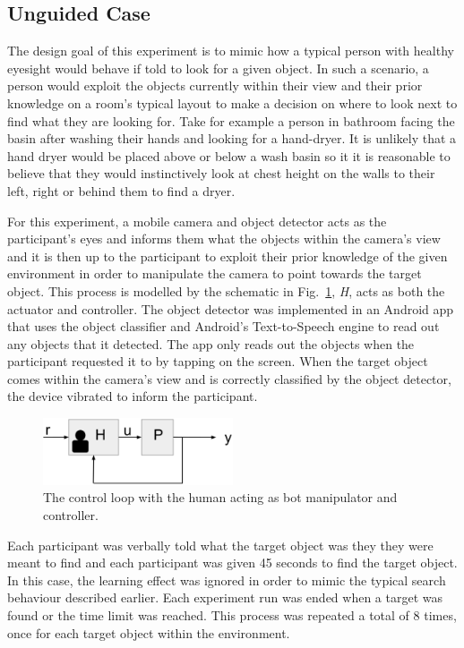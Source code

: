 \documentclass[runningheads]{llncs}
\begin{document}
\subsection{Unguided Case}

The design goal of this experiment is to mimic how a typical person with healthy eyesight would behave if told to look for a given object. 
In such a scenario, a person would exploit the objects currently within their view and their prior knowledge on a room's typical layout to make a decision on where to look next to find what they are looking for. 
Take for example a person in bathroom facing the basin after washing their hands and looking for a hand-dryer. 
It is unlikely that a hand dryer would be placed above or below a wash basin so it it is reasonable to believe that they would instinctively look at chest height on the walls to their left, right or behind them to find a dryer. 

For this experiment, a mobile camera and object detector acts as the participant's eyes and informs them what the objects within the camera's view and it is then up to the participant to exploit their prior knowledge of the given environment in order to manipulate the camera to point towards the target object. 
This process is modelled by the schematic in Fig.~\ref{fig:sys-diagram-no-controller}, \emph{H}, acts as both the actuator and controller.
The object detector was implemented in an Android app that uses the object classifier and Android's Text-to-Speech engine to read out any objects that it detected. 
The app only reads out the objects when the participant requested it to by tapping on the screen. 
When the target object comes within the camera's view and is correctly classified by the object detector, the device vibrated to inform the participant. 

\begin{figure}
  \centering
  \includegraphics[width=0.5\textwidth]{figures/control_loop_no_controller.png}
  \caption{The control loop with the human acting as bot manipulator and controller. }\label{fig:sys-diagram-no-controller}
\end{figure}

Each participant was verbally told what the target object was they they were meant to find and each participant was given 45 seconds to find the target object. 
In this case, the learning effect was ignored in order to mimic the typical search behaviour described earlier. 
Each experiment run was ended when a target was found or the time limit was reached. 
This process was repeated a total of 8 times, once for each target object within the environment. 
\end{document}
